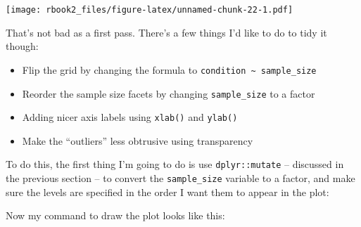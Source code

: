 \documentclass[]{book}
\newenvironment{Shaded}{\begin{snugshade}}{\end{snugshade}}
\newcommand{\CommentTok}[1]{\textcolor[rgb]{0.56,0.35,0.01}{\textit{#1}}}
\newcommand{\DataTypeTok}[1]{\textcolor[rgb]{0.13,0.29,0.53}{#1}}
\newcommand{\FloatTok}[1]{\textcolor[rgb]{0.00,0.00,0.81}{#1}}
\newcommand{\KeywordTok}[1]{\textcolor[rgb]{0.13,0.29,0.53}{\textbf{#1}}}
\newcommand{\NormalTok}[1]{#1}
\newcommand{\OperatorTok}[1]{\textcolor[rgb]{0.81,0.36,0.00}{\textbf{#1}}}
\newcommand{\StringTok}[1]{\textcolor[rgb]{0.31,0.60,0.02}{#1}}
\providecommand{\tightlist}{%
  \setlength{\itemsep}{0pt}\setlength{\parskip}{0pt}}
\begin{document}
\texttt{[image: rbook2\_files/figure-latex/unnamed-chunk-22-1.pdf]}

That's not bad as a first pass. There's a few things I'd like to do to tidy it though:

\begin{itemize}
\tightlist
\item
  Flip the grid by changing the formula to \texttt{condition\ \textasciitilde{}\ sample\_size}
\item
  Reorder the sample size facets by changing \texttt{sample\_size} to a factor
\item
  Adding nicer axis labels using \texttt{xlab()} and \texttt{ylab()}
\item
  Make the ``outliers'' less obtrusive using transparency
\end{itemize}

To do this, the first thing I'm going to do is use \texttt{dplyr::mutate} -- discussed in the previous section -- to convert the \texttt{sample\_size} variable to a factor, and make sure the levels are specified in the order I want them to appear in the plot:

\begin{Shaded}
\end{Shaded}

Now my command to draw the plot looks like this:

\begin{Shaded}
\end{Shaded}
\end{document}
